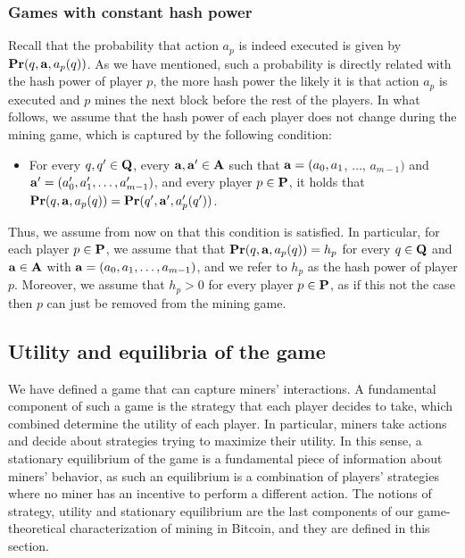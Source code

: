 \subsubsection{Games with constant hash power}
Recall that the probability that action $a_p$ is indeed executed is given by $\mathbf{Pr}(q, \mathbf{a}, a_p(q))$. As we have mentioned, such a probability is directly related with the hash power of player $p$, the more hash power the likely it is that action $a_p$ is executed and $p$ mines the next block before the rest of the players. In what follows, we assume that the hash power of each player does not change during the mining game, which is captured by the following condition:
\begin{itemize}
\item For every $q, q' \in \mathbf{Q}$, every $\mathbf{a}, \mathbf{a}' \in \mathbf{A}$ such that $\mathbf{a} = (a_0, a_1$, $\ldots$, $a_{m-1})$ and $\mathbf{a}' = (a'_0, a'_1, \ldots, a'_{m-1})$,  and every player $p \in \mathbf{P}$, it holds that $\mathbf{Pr}(q, \mathbf{a}, a_p(q)) = \mathbf{Pr}(q', \mathbf{a}', a'_p(q'))$.
\end{itemize}
Thus, we assume from now on that this condition is satisfied. In particular, for each player $p \in \mathbf{P}$, we assume that that 
$\mathbf{Pr}(q, \mathbf{a}, a_p(q)) = h_p$ for every $q \in \mathbf{Q}$ and $\mathbf{a} \in \mathbf{A}$ with $\mathbf{a} = (a_0, a_1, \ldots, a_{m-1})$, and we refer to $h_p$ as the hash power of player $p$. 
Moreover, we assume that $h_p > 0$ for every player $p \in \mathbf{P}$, as if this not the case then $p$ can just be removed from the mining game. 

\subsection{Utility and equilibria of the game}
We have defined a game that can capture miners' interactions. A fundamental component of such a game is the strategy that each player decides to take, which combined determine the utility of each player. In particular, miners take actions and decide about strategies trying to maximize their utility. In this sense, a stationary equilibrium of the game is a fundamental piece of information about miners' behavior, as such an equilibrium is a combination of players' strategies where no miner has an incentive to perform a different action. The notions of strategy, utility and stationary equilibrium are the last components of our game-theoretical characterization of mining in Bitcoin, and they are defined in this section.

